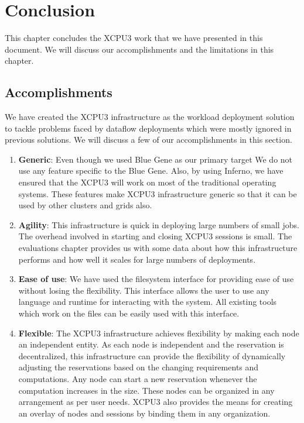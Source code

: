 \def\baselinestretch{1}
\chapter{Conclusion}
\label{chap:conclusion}

\ifpdf
    \graphicspath{{Conclusions/ConclusionsFigs/PDF/}
		{Conclusions/ConclusionsFigs/PNG/}{Conclusions/ConclusionsFigs/}}
\else
    \graphicspath{{Conclusions/ConclusionsFigs/EPS/}{Conclusions/ConclusionsFigs/}}
\fi

\def\baselinestretch{1.66}

This chapter concludes the XCPU3 work that we have presented in this document.
We will discuss our accomplishments and the limitations in this chapter.

\section{Accomplishments}
We have created the XCPU3 infrastructure as the workload deployment solution to
tackle problems faced by dataflow deployments which were mostly ignored in
previous solutions.  We will discuss a few of our accomplishments in
this section.

\begin{enumerate}
\item \textbf{Generic}: Even though we used Blue Gene as our primary target We
do not use any feature specific to the Blue Gene.  Also, by using Inferno, we
have ensured that the XCPU3 will work on most of the traditional operating
systems.  These features make XCPU3 infrastructure generic so that it can be
used by other clusters and grids also. 

\item \textbf{Agility}: This infrastructure is quick in deploying large numbers
of small jobs. The overhead involved in starting and closing XCPU3 sessions
is small. The evaluations chapter provides us with some data about how this
infrastructure performs and how well it scales for large numbers of deployments.

\item \textbf{Ease of use}:  We have used the filesystem interface for providing
ease of use without losing the flexibility.  This interface allows the user to
use any language and runtime for interacting with the system. All existing tools
which work on the files can be easily used with this interface.

\item \textbf{Flexible}: The XCPU3 infrastructure achieves flexibility by making
each node an independent entity.  As each node is independent and the
reservation is decentralized, this infrastructure can provide the flexibility of
dynamically adjusting the reservations based on the changing requirements and
computations. Any node can start a new reservation whenever the computation
increases in the size. These nodes can be organized in any arrangement as per
user needs.  XCPU3 also provides the means for creating an overlay of nodes and
sessions by binding them in any organization.
\end{enumerate}

